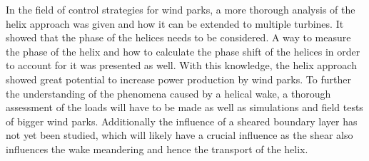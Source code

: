 In the field of control strategies for wind parks, a more thorough analysis of the helix approach was given and how it can be extended to multiple turbines. It showed that the phase of the helices needs to be considered. A way to measure the phase of the helix and how to calculate the phase shift of the helices in order to account for it was presented as well. With this knowledge, the helix approach showed great potential to increase power production by wind parks. To further the understanding of the phenomena caused by a helical wake, a thorough assessment of the loads will have to be made as well as simulations and field tests of bigger wind parks. Additionally the influence of a sheared boundary layer has not yet been studied, which will likely have a crucial influence as the shear also influences the wake meandering and hence the transport of the helix. \newpage